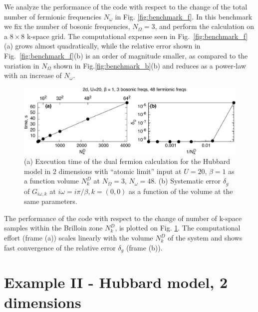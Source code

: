 \documentclass[3p,times,procedia]{elsarticle}
\begin{document}
We analyze the performance of the code with respect to the change of the total number of fermionic frequencies $N_{\omega}$  in Fig. \ref{fig:benchmark_f}.  In this benchmark we fix the number of bosonic frequencies, $N_{\Omega}=3$, and perform the calculation on a $8\times8$ k-space grid. The computational expense seen in Fig.~\ref{fig:benchmark_f}(a) grows almost quadratically, while the relative error shown in Fig.~\ref{fig:benchmark_f}(b) is an order of magnitude smaller, as compared to the variation in $N_{\Omega}$ shown in Fig.\ref{fig:benchmark_b}(b) and reduces as a power-law with an increase of $N_{\omega}$.

\begin{figure}[ht]
\includegraphics[width=1.0\columnwidth]{time_kpts.pdf}
\caption{(a) Execution time of the dual fermion calculation for the Hubbard model in $2$ dimensions with ``atomic limit'' input at $U=20$, $\beta = 1$ as a function volume $N_k^D$ at $N_{\Omega} = 3$, $N_{\omega} = 48$. (b) Systematic error $\delta_g$ of $G_{i\omega, k}$ at $i\omega = i\pi / \beta, k = (0,0)$ as a function of the volume at the same parameters.}
\label{fig:benchmark_kpts}
\end{figure}

The performance of the code with respect to the change of number of k-space samples within the Brilloin zone $N_k^D$, is plotted on Fig. \ref{fig:benchmark_kpts}. The computational effort (frame (a)) scales linearly with the volume $N_k^D$ of the system and shows fast convergence of the relative error $\delta_g$ (frame (b)).

\section{Example II - Hubbard model, 2 dimensions}\label{sec:ex}
\end{document}
